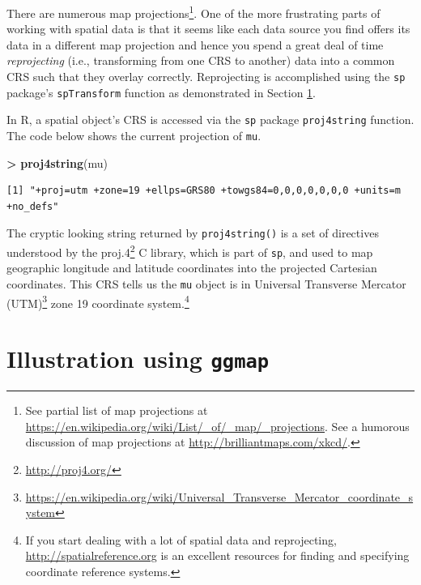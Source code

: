 \documentclass[]{krantz}
\makeatletter
\newenvironment{Shaded}{\begin{snugshade}}{\end{snugshade}}
\newcommand{\KeywordTok}[1]{\textcolor[rgb]{0.27,0.27,0.27}{\textbf{#1}}}
\newcommand{\NormalTok}[1]{#1}
\newcommand{\OperatorTok}[1]{\textcolor[rgb]{0.43,0.43,0.43}{\textbf{#1}}}
\newcommand{\StringTok}[1]{\textcolor[rgb]{0.5,0.5,0.5}{#1}}
\renewcommand{\href}[2]{#2\footnote{\url{#1}}}
\newenvironment{kframe}{%
\medskip{}
\setlength{\fboxsep}{.8em}
 \def\at@end@of@kframe{}%
 \ifinner\ifhmode%
  \def\at@end@of@kframe{\end{minipage}}%
  \begin{minipage}{\columnwidth}%
 \fi\fi%
 \def\FrameCommand##1{\hskip\@totalleftmargin \hskip-\fboxsep
 \colorbox{shadecolor}{##1}\hskip-\fboxsep
     \hskip-\linewidth \hskip-\@totalleftmargin \hskip\columnwidth}%
 \MakeFramed {\advance\hsize-\width
   \@totalleftmargin\z@ \linewidth\hsize
   \@setminipage}}%
 {\par\unskip\endMakeFramed%
 \at@end@of@kframe}
\renewenvironment{Shaded}{\begin{kframe}}{\end{kframe}}
\makeatother
\begin{document}
There are numerous map projections\footnote{See partial list of map projections at \url{https://en.wikipedia.org/wiki/List/_of/_map/_projections}. See a humorous discussion of map projections at \url{http://brilliantmaps.com/xkcd/}.}. One of the more frustrating parts of working with spatial data is that it seems like each data source you find offers its data in a different map projection and hence you spend a great deal of time \emph{reprojecting} (i.e., transforming from one CRS to another) data into a common CRS such that they overlay correctly. Reprojecting is accomplished using the \texttt{sp} package's \texttt{spTransform} function as demonstrated in Section \ref{ggmap}.

In R, a spatial object's CRS is accessed via the \texttt{sp} package \texttt{proj4string} function. The code below shows the current projection of \texttt{mu}.

\begin{Shaded}
\begin{Highlighting}[]
\OperatorTok{>}\StringTok{ }\KeywordTok{proj4string}\NormalTok{(mu)}
\end{Highlighting}
\end{Shaded}

\begin{verbatim}
[1] "+proj=utm +zone=19 +ellps=GRS80 +towgs84=0,0,0,0,0,0,0 +units=m +no_defs"
\end{verbatim}

The cryptic looking string returned by \texttt{proj4string()} is a set of directives understood by the \href{http://proj4.org/}{proj.4} C library, which is part of \texttt{sp}, and used to map geographic longitude and latitude coordinates into the projected Cartesian coordinates. This CRS tells us the \texttt{mu} object is in \href{https://en.wikipedia.org/wiki/Universal_Transverse_Mercator_coordinate_system}{Universal Transverse Mercator (UTM)} zone 19 coordinate system.\footnote{If you start dealing with a lot of spatial data and reprojecting, \url{http://spatialreference.org} is an excellent resources for finding and specifying coordinate reference systems.}

\hypertarget{ggmap}{%
\section{\texorpdfstring{Illustration using \texttt{ggmap}}{Illustration using ggmap}}\label{ggmap}}
\end{document}

